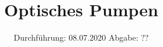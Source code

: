 

\subject{Nr. 21}
\title{Optisches Pumpen}
\date{%
  Durchführung: 08.07.2020
  \hspace{3em}
  Abgabe: ??
}



\maketitle
\thispagestyle{empty}
\tableofcontents
\newpage






\printbibliography{}


